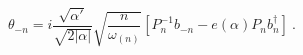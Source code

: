 \begin{equation}
\theta_{-n}= i \frac{\sqrt{\alpha'}}{\sqrt{2 |\alpha|}} 
\sqrt{\frac{n}{\omega_{(n)}}} 
\left[ P^{-1}_n b_{-n} - e(\alpha) P_n b_{n}^{\dagger} \right]~.
\label{Pth-nsv}
\end{equation}

